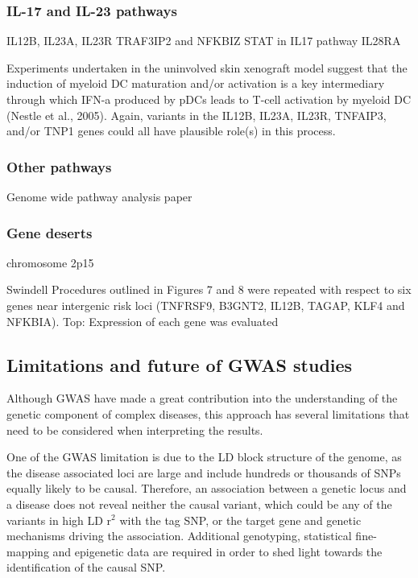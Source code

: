 
\subsubsection{IL-17 and IL-23 pathways}


IL12B, IL23A, IL23R TRAF3IP2 and NFKBIZ
STAT in IL17 pathway
IL28RA


Experiments
undertaken in the uninvolved skin xenograft model suggest
that the induction of myeloid DC maturation and/or activation
is a key intermediary through which IFN-a produced by
pDCs leads to T-cell activation by myeloid DC (Nestle et al.,
2005). Again, variants in the IL12B, IL23A, IL23R, TNFAIP3,
and/or TNP1 genes could all have plausible role(s) in this
process.


\subsubsection{Other pathways}
Genome wide pathway analysis paper

\subsubsection{Gene deserts}
chromosome 2p15

Swindell
Procedures outlined in Figures 7 and 8 were repeated with respect to six genes near intergenic risk loci (TNFRSF9, B3GNT2, IL12B, TAGAP, KLF4 and NFKBIA). Top: Expression of each gene was evaluated 


\subsection{Limitations and future of GWAS studies}
Although GWAS have made a great contribution into the understanding of the genetic component of complex diseases, this approach has several limitations that need to be considered when interpreting the results. 

One of the GWAS limitation is due to the LD block structure of the genome, as the disease associated loci are large and include hundreds or thousands of SNPs equally likely to be causal. Therefore, an association between a genetic locus and a disease does not reveal neither the causal variant, which could be any of the variants in high LD r$^2$ with the tag SNP, or the target gene and genetic mechanisms driving the association. Additional genotyping, statistical fine-mapping and epigenetic data are required in order to shed light towards the identification of the causal SNP.

